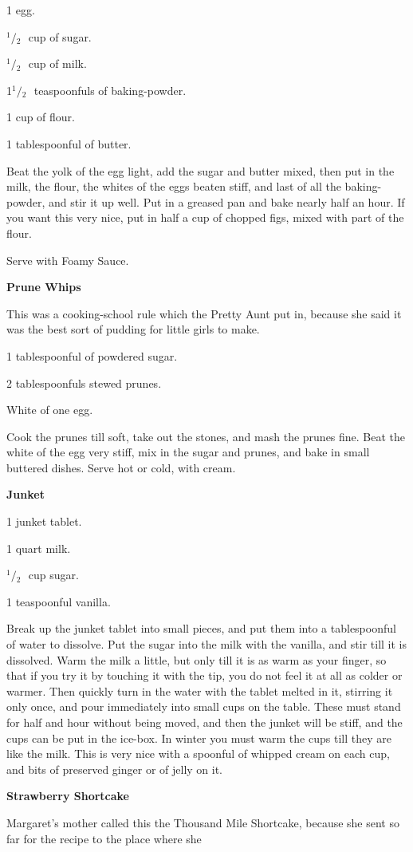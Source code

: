 \documentclass[11pt]{book}
\newcommand{\indpar}{\par\noindent\hspace*{\parindent}}
\newcommand{\ingredient}{\indpar}
\newcommand{\instruction}{\indpar}
\newcommand{\OneHalf}{\ensuremath{{}^1\!\!/\!{}_2\mbox{\ }}}
\newenvironment{RecipeTitle}{\medskip\begin{center}\large\bf }{\end{center}\smallskip}
\begin{document}
\ingredient  1 egg.
\ingredient  \OneHalf cup of sugar.
\ingredient  \OneHalf cup of milk.
\ingredient  1\OneHalf teaspoonfuls of baking-powder.
\ingredient  1 cup of flour.
\ingredient  1 tablespoonful of butter.
\instruction  Beat the yolk of the egg light, add the sugar and butter
mixed, then put in the milk, the flour, the whites of the eggs
beaten stiff, and last of all the baking-powder, and stir it
up well.  Put in a greased pan and bake nearly half an hour.
If you want this very nice, put in half a cup of chopped figs,
mixed with part of the flour.
\instruction  Serve with Foamy Sauce.
\begin{RecipeTitle}
Prune Whips\label{prune_whips}
\end{RecipeTitle}
\instruction  This was a cooking-school rule which the Pretty Aunt put in,
because she said it was the best sort of pudding for little
girls to make.
\ingredient  1 tablespoonful of powdered sugar.
\ingredient  2 tablespoonfuls stewed prunes.
\ingredient  White of one egg.
\instruction  Cook the prunes till soft, take out the stones, and mash the
prunes fine.  Beat the white of the egg very stiff, mix in the
sugar and prunes, and bake in small buttered dishes.  Serve
hot or cold, with cream.
\begin{RecipeTitle}
Junket\label{junket}
\end{RecipeTitle}
\ingredient  1 junket tablet.
\ingredient  1 quart milk.
\ingredient  \OneHalf cup sugar.
\ingredient  1 teaspoonful vanilla.
\instruction  Break up the junket tablet into small pieces, and put them
into a tablespoonful of water to dissolve.  Put the sugar into
the milk with the vanilla, and stir till it is dissolved.
Warm the milk a little, but only till it is as warm as your
finger, so that if you try it by touching it with the tip, you
do not feel it at all as colder or warmer.  Then quickly turn
in the water with the tablet melted in it, stirring it only
once, and pour immediately into small cups on the table.
These must stand for half and hour without being moved, and
then the junket will be stiff, and the cups can be put in the
ice-box.  In winter you must warm the cups till they are like
the milk.  This is very nice with a spoonful of whipped cream
on each cup, and bits of preserved ginger or of jelly on it.
\begin{RecipeTitle}
Strawberry Shortcake\label{strawberry_shortcake}
\end{RecipeTitle}
\instruction  Margaret's mother called this the Thousand Mile Shortcake,
because she sent so far for the recipe to the place where she
\end{document}
